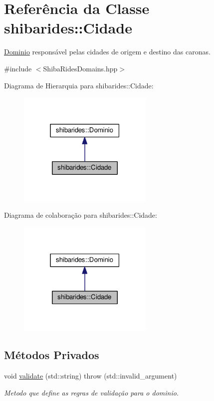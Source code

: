 \hypertarget{classshibarides_1_1Cidade}{}\section{Referência da Classe shibarides\+:\+:Cidade}
\label{classshibarides_1_1Cidade}


\hyperlink{classshibarides_1_1Dominio}{Dominio} responsável pelas cidades de origem e destino das caronas.  




{\ttfamily \#include $<$Shiba\+Rides\+Domains.\+hpp$>$}



Diagrama de Hierarquia para shibarides\+:\+:Cidade\+:\nopagebreak
\begin{figure}[H]
\begin{center}
\leavevmode
\includegraphics[width=183pt]{classshibarides_1_1Cidade__inherit__graph}
\end{center}
\end{figure}


Diagrama de colaboração para shibarides\+:\+:Cidade\+:\nopagebreak
\begin{figure}[H]
\begin{center}
\leavevmode
\includegraphics[width=183pt]{classshibarides_1_1Cidade__coll__graph}
\end{center}
\end{figure}
\subsection*{Métodos Privados}
\begin{DoxyCompactItemize}
\item 
void \hyperlink{classshibarides_1_1Cidade_a2a2455d16a0d316ebcc57c4389e1a0b0}{validate} (std\+::string)  throw (std\+::invalid\+\_\+argument)
\begin{DoxyCompactList}\small\item\em Metodo que define as regras de validação para o dominio. \end{DoxyCompactList}\end{DoxyCompactItemize}
